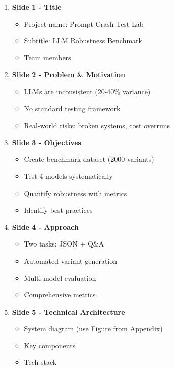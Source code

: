 \documentclass[11pt,a4paper]{article}
\begin{document}
\begin{enumerate}[leftmargin=*]
    \item \textbf{Slide 1 - Title}
    \begin{itemize}
        \item Project name: Prompt Crash-Test Lab
        \item Subtitle: LLM Robustness Benchmark
        \item Team members
    \end{itemize}
    
    \item \textbf{Slide 2 - Problem \& Motivation}
    \begin{itemize}
        \item LLMs are inconsistent (20-40\% variance)
        \item No standard testing framework
        \item Real-world risks: broken systems, cost overruns
    \end{itemize}
    
    \item \textbf{Slide 3 - Objectives}
    \begin{itemize}
        \item Create benchmark dataset (2000 variants)
        \item Test 4 models systematically
        \item Quantify robustness with metrics
        \item Identify best practices
    \end{itemize}
    
    \item \textbf{Slide 4 - Approach}
    \begin{itemize}
        \item Two tasks: JSON + Q\&A
        \item Automated variant generation
        \item Multi-model evaluation
        \item Comprehensive metrics
    \end{itemize}
    
    \item \textbf{Slide 5 - Technical Architecture}
    \begin{itemize}
        \item System diagram (use Figure from Appendix)
        \item Key components
        \item Tech stack
    \end{itemize}
    

\end{enumerate}
\end{document}
